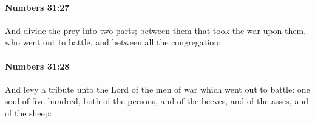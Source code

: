 		\paragraph{Numbers 31:27} %
			\label{NUMBERS-31-27}

			And divide the prey into two parts; between them that took the war upon them, who went out to battle, and between all the congregation:


		\paragraph{Numbers 31:28} %
			\label{NUMBERS-31-28}

			And levy a tribute unto the Lord of the men of war which went out to battle: one soul of five hundred, both of the persons, and of the beeves, and of the asses, and of the sheep:


